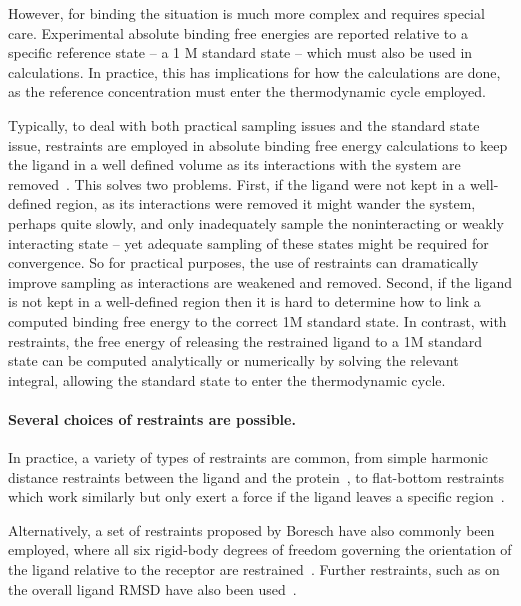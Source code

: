 \documentclass[9pt,bestpractices]{livecoms}
\begin{document}
However, for binding the situation is much more complex and requires special care.
Experimental absolute binding free energies are reported relative to a specific reference state -- a 1 M standard state -- which must also be used in calculations.
In practice, this has implications for how the calculations are done, as the reference concentration must enter the thermodynamic cycle employed.


Typically, to deal with both practical sampling issues and the standard state issue, restraints are employed in absolute binding free energy calculations to keep the ligand in a well defined volume as its interactions with the system are removed~\cite{gilson1997statisticalthermodynamic}.
This solves two problems.
First, if the ligand were not kept in a well-defined region, as its interactions were removed it might wander the system, perhaps quite slowly, and only inadequately sample the noninteracting or weakly interacting state -- yet adequate sampling of these states might be required for convergence.
So for practical purposes, the use of restraints can dramatically improve sampling as interactions are weakened and removed.
Second, if the ligand is not kept in a well-defined region then it is hard to determine how to link a computed binding free energy to the correct 1M standard state.
In contrast, with restraints, the free energy of releasing the restrained ligand to a 1M standard state can be computed analytically or numerically by solving the relevant integral, allowing the standard state to enter the thermodynamic cycle.

\paragraph{Several choices of restraints are possible.}
In practice, a variety of types of restraints are common, from simple harmonic distance restraints between the ligand and the protein~\cite{mobley2006use}, to flat-bottom restraints which work similarly but only exert a force if the ligand leaves a specific region~\cite{}.

Alternatively, a set of restraints proposed by Boresch have also commonly been employed, where all six rigid-body degrees of freedom governing the orientation of the ligand relative to the receptor are restrained~\cite{leitgeb2005alchemical}.
Further restraints, such as on the overall ligand RMSD have also been used~\cite{woo2005calculation}.
\end{document}
